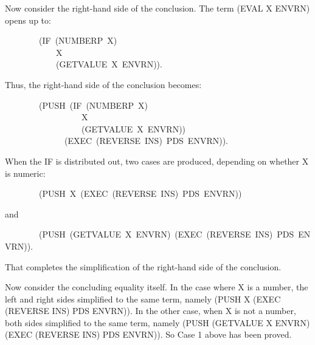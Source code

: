 \documentclass[11pt]{book}
\newenvironment{pubasis}{\begin{flushleft}\ttfamily\small}{\normalsize\rmfamily\end{flushleft}}
\begin{document}
Now consider the right-hand side of the conclusion.  The term
(EVAL X ENVRN) opens up to:
\begin{pubasis}
~~~~~~~~(IF~(NUMBERP~X)\\
~~~~~~~~~~~~X\\
~~~~~~~~~~~~(GETVALUE~X~ENVRN)).\\
\end{pubasis}
Thus, the right-hand side of the conclusion becomes:
\begin{pubasis}
~~~~~~~~(PUSH~(IF~(NUMBERP~X)\\
~~~~~~~~~~~~~~~~~~X\\
~~~~~~~~~~~~~~~~~~(GETVALUE~X~ENVRN))\\
~~~~~~~~~~~~~~(EXEC~(REVERSE~INS)~PDS~ENVRN)).\\
\end{pubasis}
When the IF is distributed out, two cases are produced, depending
on whether X is numeric:
\begin{pubasis}
~~~~~~~~(PUSH~X~(EXEC~(REVERSE~INS)~PDS~ENVRN))\\
\end{pubasis}
and
\begin{pubasis}
~~~~~~~~(PUSH~(GETVALUE~X~ENVRN)~(EXEC~(REVERSE~INS)~PDS~ENVRN)).\\
\end{pubasis}
That completes the simplification of the right-hand side of
the conclusion.

Now consider the concluding equality itself.  In the case where X is
a number, the left and right sides simplified to the same term, namely
(PUSH X (EXEC (REVERSE INS) PDS ENVRN)).  In the other case,
when X is not a number, both sides simplified to the same term,
namely (PUSH (GETVALUE X ENVRN) (EXEC (REVERSE INS) PDS ENVRN)).  So Case 1
above has been proved.
\end{document}

